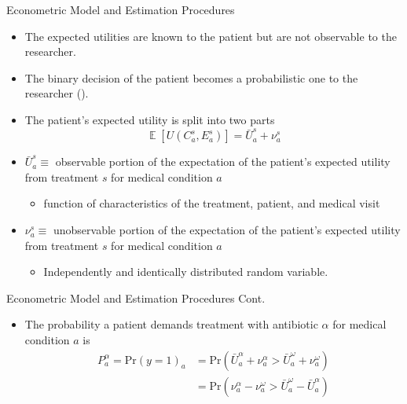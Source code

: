 \documentclass{beamer}
\DeclareMathOperator{\EX}{\mathbb{E}}
\begin{document}
\begin{frame}{Econometric Model and Estimation Procedures}
\begin{itemize}
\item The expected utilities are known to the patient but are not observable to the researcher.
\item The binary decision of the patient becomes a probabilistic one to the researcher (\cite{train_discrete_nodate}).
\item The patient's expected utility is split into two parts
\begin{equation}
  \EX[U(C_a^s,E_a^s)] = \bar{U}_a^s + \nu_a^s
\end{equation}
\item $\bar{U}_a^s \equiv$ observable portion of the expectation of the patient's expected utility from treatment $s$ for medical condition $a$
\begin{itemize}
  \item function of characteristics of the treatment, patient, and medical visit
\end{itemize}
\item $\nu_a^s \equiv$ unobservable portion of the expectation of the patient's expected utility from treatment $s$ for medical condition $a$
\begin{itemize}
  \item Independently and identically distributed random variable.
\end{itemize}
\end{itemize}
\end{frame}

\begin{frame}{Econometric Model and Estimation Procedures Cont.}
\begin{itemize}
\item The probability a patient demands treatment with antibiotic $\alpha$ for medical condition $a$ is
  \begin{equation}
  \begin{split}
      P_a^\alpha =\text{Pr}(y = 1)_a & = \text{Pr}(\bar{U}_a^\alpha + \nu_a^\alpha > \bar{U}_a^\omega + \nu_a^\omega)\\
      & = \text{Pr}(\nu_a^\alpha - \nu_a^\omega > \bar{U}_a^\omega - \bar{U}_a^\alpha)\\
  \end{split}
  \end{equation}
\end{itemize}  
\end{frame}
\end{document}
